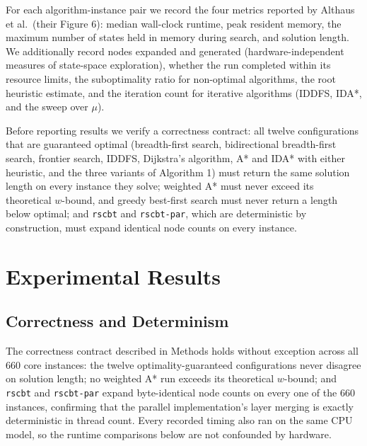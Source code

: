 \documentclass[letterpaper]{article}
\begin{document}
For each algorithm-instance pair we record the four metrics reported by
Althaus et al.\ (their Figure 6): median wall-clock runtime, peak resident
memory, the maximum number of states held in memory during search, and
solution length. We additionally record nodes expanded and generated
(hardware-independent measures of state-space exploration), whether the run
completed within its resource limits, the suboptimality ratio for
non-optimal algorithms, the root heuristic estimate, and the iteration
count for iterative algorithms (IDDFS, IDA*, and the sweep over $\mu$).

Before reporting results we verify a correctness contract: all twelve
configurations that are guaranteed optimal (breadth-first search,
bidirectional breadth-first search, frontier search, IDDFS, Dijkstra's
algorithm, A* and IDA* with either heuristic, and the three variants of
Algorithm 1) must return the same solution length on every instance they
solve; weighted A* must never exceed its theoretical $w$-bound, and greedy
best-first search must never return a length below optimal; and
\texttt{rscbt} and \texttt{rscbt-par}, which are deterministic by
construction, must expand identical node counts on every instance.

\section{Experimental Results}

\subsection{Correctness and Determinism}

The correctness contract described in Methods holds without exception
across all 660 core instances: the twelve optimality-guaranteed
configurations never disagree on solution length; no weighted A* run
exceeds its theoretical $w$-bound; and \texttt{rscbt} and
\texttt{rscbt-par} expand byte-identical node counts on every one of the
660 instances, confirming that the parallel implementation's layer merging
is exactly deterministic in thread count. Every recorded timing also ran on
the same CPU model, so the runtime comparisons below are not confounded by
hardware.
\end{document}
